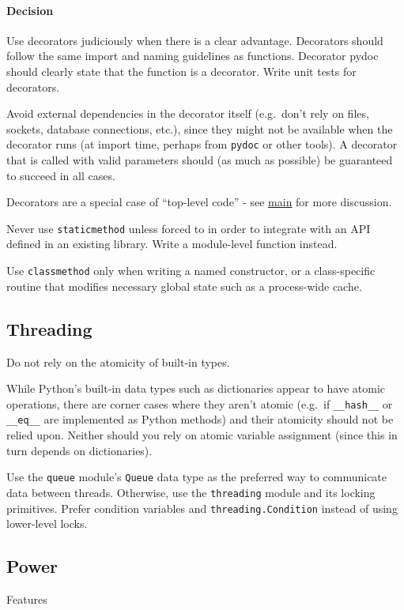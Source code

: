 \documentclass[
]{article}
\begin{document}
\paragraph{Decision}

Use decorators judiciously when there is a clear advantage. Decorators
should follow the same import and naming guidelines as functions.
Decorator pydoc should clearly state that the function is a decorator.
Write unit tests for decorators.

Avoid external dependencies in the decorator itself (e.g.~don't rely on
files, sockets, database connections, etc.), since they might not be
available when the decorator runs (at import time, perhaps from
\texttt{pydoc} or other tools). A decorator that is called with valid
parameters should (as much as possible) be guaranteed to succeed in all
cases.

Decorators are a special case of ``top-level code'' - see
\hyperref[s3.17-main]{main} for more discussion.

Never use \texttt{staticmethod} unless forced to in order to integrate
with an API defined in an existing library. Write a module-level
function instead.

Use \texttt{classmethod} only when writing a named constructor, or a
class-specific routine that modifies necessary global state such as a
process-wide cache.

\subsection{Threading}

Do not rely on the atomicity of built-in types.

While Python's built-in data types such as dictionaries appear to have
atomic operations, there are corner cases where they aren't atomic
(e.g.~if \texttt{\_\_hash\_\_} or \texttt{\_\_eq\_\_} are implemented as
Python methods) and their atomicity should not be relied upon. Neither
should you rely on atomic variable assignment (since this in turn
depends on dictionaries).

Use the \texttt{queue} module's \texttt{Queue} data type as the
preferred way to communicate data between threads. Otherwise, use the
\texttt{threading} module and its locking primitives. Prefer condition
variables and \texttt{threading.Condition} instead of using lower-level
locks.

\subsection{Power} Features
\end{document}
